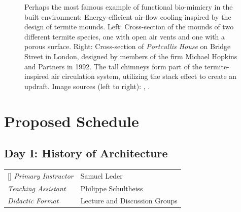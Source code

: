 \documentclass{article}
\begin{document}
\begin{figure}[ht!]
    \centering
    \caption{Perhaps the most famous example of functional bio-mimicry in the built environment: Energy-efficient air-flow cooling inspired by the design of termite mounds. Left: Cross-section of the mounds of two different termite species, one with open air vents and one with a porous surface. Right: Cross-section of \textit{Portcullis House} on Bridge Street in London, designed by members of the firm Michael Hopkins and Partners in 1992. The tall chimneys form part of the termite-inspired air circulation system, utilizing the stack effect to create an updraft. \newline Image sources (left to right): \cite{turner_beyond_2008}, \cite{davies_hopkins2_2001}.}
    \label{fig:ventilation}
\end{figure}


\clearpage
\section{Proposed Schedule}
\subsection{Day I: History of Architecture}

\begin{NiceTabular}{W{l}{3cm}l}[]
\textit{Primary Instructor} & Samuel Leder \\
\textit{Teaching Assistant} & Philippe Schultheiss \\
\textit{Didactic Format} & Lecture and Discussion Groups
\end{NiceTabular}
\end{document}
